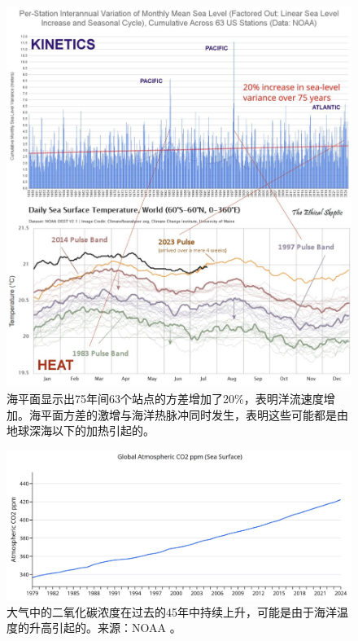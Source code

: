 \documentclass[10pt,twocolumn,letterpaper]{article}
\begin{document}
\begin{figure}[t]
\begin{center}
\includegraphics[width=1\textwidth]{sealevel.jpeg}
\end{center}
   \caption{海平面显示出75年间63个站点的方差增加了20\%，表明洋流速度增加。海平面方差的激增与海洋热脉冲同时发生，表明这些可能都是由地球深海以下的加热引起的\cite{2,129}。}
\label{fig:22}
\end{figure}
\begin{figure}[t]
\begin{center}
\includegraphics[width=1\textwidth]{co2.jpg}
\end{center}
   \caption{大气中的二氧化碳浓度在过去的45年中持续上升，可能是由于海洋温度的升高引起的。来源：NOAA \cite{148,129}。}
\label{fig:23}
\end{figure}
\end{document}
